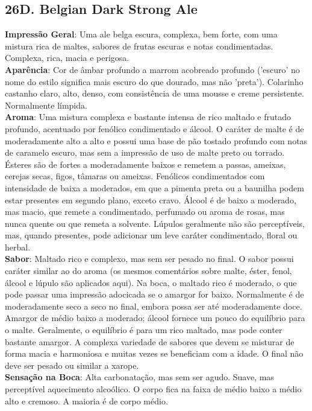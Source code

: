 \subsection*{26D. Belgian Dark Strong Ale}
\textbf{Impressão Geral}: Uma ale belga escura, complexa, bem forte, com uma mistura rica de maltes, sabores de frutas escuras e notas condimentadas. Complexa, rica, macia e perigosa. \\
\textbf{Aparência}: Cor de âmbar profundo a marrom acobreado profundo ('escuro' no nome do estilo significa mais escuro do que dourado, mas não 'preta'). Colarinho castanho claro, alto, denso, com consistência de uma mousse e creme persistente. Normalmente límpida. \\
\textbf{Aroma}: Uma mistura complexa e bastante intensa de rico maltado e frutado profundo, acentuado por fenólico condimentado e álcool. O caráter de malte é de moderadamente alto a alto e possui uma base de pão tostado profundo com notas de caramelo escuro, mas sem a impressão de uso de malte preto ou torrado. Ésteres são de fortes a moderadamente baixos e remetem a passas, ameixas, cerejas secas, figos, tâmaras ou ameixas. Fenólicos condimentados com intensidade de baixa a moderados, em que a pimenta preta ou a baunilha podem estar presentes em segundo plano, exceto cravo. Álcool é de baixo a moderado, mas macio, que remete a condimentado, perfumado ou aroma de rosas, mas nunca quente ou que remeta a solvente. Lúpulos geralmente não são perceptíveis, mas, quando presentes, pode adicionar um leve caráter condimentado, floral ou herbal. \\
\textbf{Sabor}: Maltado rico e complexo, mas sem ser pesado no final. O sabor possui caráter similar ao do aroma (os mesmos comentários sobre malte, éster, fenol, álcool e lúpulo são aplicados aqui). Na boca, o maltado rico é moderado, o que pode passar uma impressão adocicada se o amargor for baixo. Normalmente é de moderadamente seco a seco no final, embora possa ser até moderadamente doce. Amargor de médio baixo a moderado; álcool fornece um pouco do equilíbrio para o malte. Geralmente, o equilíbrio é para um rico maltado, mas pode conter bastante amargor. A complexa variedade de sabores que devem se misturar de forma macia e harmoniosa e muitas vezes se beneficiam com a idade. O final não deve ser pesado ou similar a xarope. \\
\textbf{Sensação na Boca}: Alta carbonatação, mas sem ser agudo. Suave, mas perceptível aquecimento alcoólico. O corpo fica na faixa de médio baixo a médio alto e cremoso. A maioria é de corpo médio. \\
